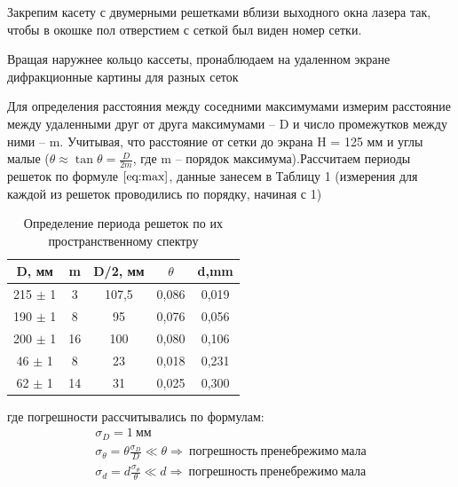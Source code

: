 \documentclass[a4paper,12pt]{article}
\begin{document}
Закрепим касету с двумерными решетками вблизи выходного окна лазера так, чтобы в окошке пол отверстием с сеткой был виден номер сетки.

Вращая наружнее кольцо кассеты, пронаблюдаем на удаленном экране дифракционные картины для разных сеток 

Для определения расстояния между соседними максимумами измерим расстояние между удаленными друг от друга максимумами -- D и число промежутков между ними -- m. Учитывая, что расстояние от сетки до экрана H = 125 мм и углы малые ($\theta \approx \tan \theta = \frac{D}{2m}$, где m -- порядок максимума).Рассчитаем периоды решеток по формуле $\ref{eq:max}$, данные занесем в Таблицу 1 (измерения для каждой из решеток проводились по порядку, начиная с 1)

\begin{table}[h]
\begin{center}
\label{table:spectre}
\caption{Определение периода решеток по их пространственному спектру}
\begin{tabular}{|c|c|c|c|c|}
\hline
\textbf{D, мм} & \textbf{m} & \textbf{D/2, мм} & \textbf{$\theta$} & \textbf{d,mm} \\ \hline
215	$\pm$ 1		& 3          & 107,5            & 0,086                          & 0,019         \\ \hline
190 $\pm$ 1		& 8          & 95               & 0,076                          & 0,056         \\ \hline
200 $\pm$ 1		& 16         & 100              & 0,080                          & 0,106         \\ \hline
46 $\pm$ 1		& 8          & 23               & 0,018                          & 0,231         \\ \hline
62 $\pm$ 1		& 14         & 31               & 0,025                          & 0,300         \\ \hline
\end{tabular}
\end{center}
\end{table} 

где погрешности рассчитывались по формулам:
\begin{gather*}
\sigma_{D} = 1 \ мм \\
%
\sigma_{\theta} = \theta  \frac{\sigma_{D}}{D} \ll \theta \Rightarrow \ погрешность \ пренебрежимо \ мала \\
%
\sigma_{d} = d \frac{\sigma_{\theta}}{\theta} \ll  d \Rightarrow \ погрешность \ пренебрежимо \ мала
\end{gather*}
\end{document}
